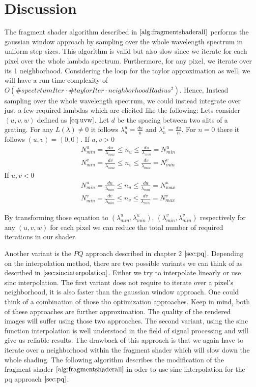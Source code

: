\section{Discussion}
\label{sec:impldiscus}
The fragment shader algorithm described in $\ref{alg:fragmentshaderall}$ performs the gaussian window approach by sampling over the whole wavelength spectrum in uniform step sizes. This algorithm is valid but also slow since we iterate for each pixel over the whole lambda spectrum. Furthermore, for any pixel, we iterate over its 1 neighborhood. Considering the loop for the taylor approximation as well, we will have a run-time complexity of $O(\#spectrtumIter \cdot \#taylorIter \cdot neighborhoodRadius^2)$. 
Hence, Instead sampling over the whole wavelength spectrum, we could instead integrate over just a few required lambdas which are elicited like the following: Lets consider $(u,v,w)$ defined as $\ref{eq:uvw}$. Let $d$ be the spacing between two slits of a grating. For any $L(\lambda) \neq 0$ it follows $\lambda_{n}^{u} = \frac{d u}{n}$ and $\lambda_{n}^{v} = \frac{d u}{n}$. For $n = 0$ there it follows $(u,v)=(0,0)$. 
If $u,v > 0$
\begin{align*}
    N_{min}^{u} = \frac{d u}{\lambda_{max}} \leq n_{u} \leq \frac{d u}{\lambda_{min}} = N_{min}^{u}\\
    N_{min}^{v} = \frac{d v}{\lambda_{max}} \leq n_{v} \leq \frac{d v}{\lambda_{min}} = N_{min}^{v}
\end{align*}
If $u,v < 0$
\begin{align*}
    N_{min}^{u} = \frac{d u}{\lambda_{min}} \leq n_{u} \leq \frac{d u}{\lambda_{min}} = N_{max}^{u}\\
    N_{min}^{v} = \frac{d v}{\lambda_{min}} \leq n_{v} \leq \frac{d v}{\lambda_{min}} = N_{max}^{v}
\end{align*}

By transforming those equation to $(\lambda_{min}^{u}, \lambda_{min}^{u})$, $(\lambda_{min}^{v}, \lambda_{min}^{v})$ respectively for any $(u,v,w)$ for each pixel we can reduce the total number of required iterations in our shader.  

Another variant is the $PQ$ approach described in chapter 2 $\ref{sec:pq}$. Depending on the interpolation method, there are two possible variants we can think of as described in $\ref{sec:sincinterpolation}$. Either we try to interpolate linearly or use sinc interpolation.
The first variant does not require to iterate over a pixel's neighborhood, it is also faster than the gaussian window approach. One could think of a combination of those tho optimization approaches. Keep in mind, both of these approaches are further approximation. The quality of the rendered images will suffer using those two approaches. The second variant, using the sinc function interpolation is well understood in the field of signal processing and will give us reliable results. The drawback of this approach is that we again have to iterate over a neighborhood within the fragment shader which will slow down the whole shading. The following algorithm describes the modification of the fragment shader  $\ref{alg:fragmentshaderall}$ in oder to use sinc interpolation for the pq approach $\ref{sec:pq}$.  

